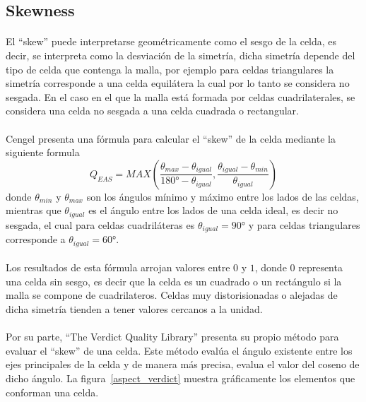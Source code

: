 \documentclass[letterpaper, openright, 12pt]{book}
\begin{document}
    \subsection{Skewness}
    \paragraph*{}
    El ``skew'' puede interpretarse geométricamente como el sesgo de la celda,
    es decir, se interpreta como la desviación de la simetría, dicha simetría
    depende del tipo de celda que contenga la malla, por ejemplo para celdas
    triangulares la simetría corresponde a una celda equilátera la cual por lo
    tanto se considera no sesgada. En el caso en el que la malla está formada
    por celdas cuadrilaterales, se considera una celda no sesgada a una celda
    cuadrada o rectangular.

    \paragraph*{}
    Cengel \cite{cengel} presenta una fórmula para calcular el ``skew'' de la
    celda mediante la siguiente formula
    \begin{equation}
      Q_{EAS} = MAX \left(
      \frac{\theta_{max} - \theta_{igual}}{180\si{\degree} - \theta_{igual}},
      \frac{\theta_{igual} - \theta_{min}}{\theta_{igual}}
      \right)
    \end{equation}
    donde $\theta_{min}$ y $\theta_{max}$ son los ángulos mínimo y máximo entre
    los lados de las celdas, mientras que $\theta_{igual}$ es el ángulo entre
    los lados de una celda ideal, es decir no sesgada, el cual para celdas
    cuadriláteras es $\theta_{igual} = 90\si{\degree}$ y para celdas
    triangulares corresponde a $\theta_{igual} = 60\si{\degree}$.

    \paragraph*{}
    Los resultados de esta fórmula arrojan valores entre $0$ y $1$, donde $0$
    representa una celda sin sesgo, es decir que la celda es un cuadrado o un
    rectángulo si la malla se compone de cuadrilateros. Celdas muy
    distorisionadas o alejadas de dicha simetría tienden a tener valores
    cercanos a la unidad.

    \paragraph*{}
    Por su parte, ``The Verdict Quality Library'' presenta su propio método
    para evaluar el ``skew'' de una celda. Este método evalúa el ángulo
    existente entre los ejes principales de la celda y de manera más precisa,
    evalua el valor del coseno de dicho ángulo. La figura~\ref{aspect_verdict}
    muestra gráficamente los elementos que conforman una celda.  
\end{document}
